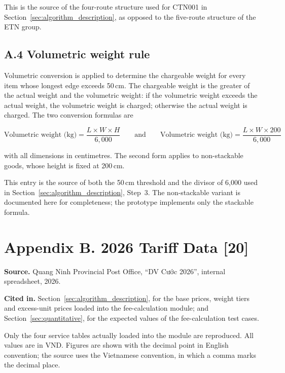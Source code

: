 \noindent This is the source of the four-route structure used for CTN001 in Section~\ref{sec:algorithm_description}, as opposed to the five-route structure of the ETN group.

\subsection*{A.4 Volumetric weight rule}

\noindent Volumetric conversion is applied to determine the chargeable weight for every item whose longest edge exceeds 50\,cm. The chargeable weight is the greater of the actual weight and the volumetric weight: if the volumetric weight exceeds the actual weight, the volumetric weight is charged; otherwise the actual weight is charged. The two conversion formulas are

\[ \text{Volumetric weight (kg)} = \frac{L \times W \times H}{6{,}000}
   \qquad\text{and}\qquad
   \text{Volumetric weight (kg)} = \frac{L \times W \times 200}{6{,}000} \]

\noindent with all dimensions in centimetres. The second form applies to non-stackable goods, whose height is fixed at 200\,cm.

\noindent This entry is the source of both the 50\,cm threshold and the divisor of 6,000 used in Section~\ref{sec:algorithm_description}, Step~3. The non-stackable variant is documented here for completeness; the prototype implements only the stackable formula.

\section*{Appendix B. 2026 Tariff Data [20]}
{}

\noindent \textbf{Source.} Quang Ninh Provincial Post Office, ``DV Cước 2026'', internal spreadsheet, 2026.

\noindent \textbf{Cited in.} Section~\ref{sec:algorithm_description}, for the base prices, weight tiers and excess-unit prices loaded into the fee-calculation module; and Section~\ref{sec:quantitative}, for the expected values of the fee-calculation test cases.

\noindent Only the four service tables actually loaded into the module are reproduced. All values are in VND. Figures are shown with the decimal point in English convention; the source uses the Vietnamese convention, in which a comma marks the decimal place.

